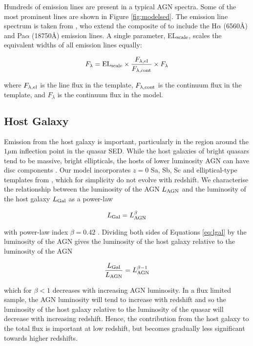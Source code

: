 Hundreds of emission lines are present in a typical AGN spectra. 
Some of the most prominent lines are shown in Figure \ref{fig:modelsed}. 
The emission line spectrum is taken from \citet{maddox06}, who extend the composite of \citet{francis91} to include the H$\alpha$ (6560\AA) and Pa$\alpha$ (18750\AA) emission lines. 
A single parameter, EL$_{\rm scale}$, scales the equivalent widths of all emission lines equally:

\begin{eqnarray}
  F_{\lambda} =  {\rm EL}_{\rm scale} \times \frac{F_{\lambda, \rm el}}{F_{\lambda, \rm cont}} \times F_{\lambda} 
\end{eqnarray} 

where $F_{\lambda, \rm el}$ is the line flux in the template, $F_{\lambda,\rm cont}$ is the continuum flux in the template, and $F_{\lambda}$ is the continuum flux in the model.  

\subsection{Host Galaxy}

Emission from the host galaxy is important, particularly in the region around the $1\mu$m inflection point in the quasar SED. 
While the host galaxies of bright quasars tend to be massive, bright ellipticals, the hosts of lower luminosity AGN can have disc components \citep[e.g.][]{dunlop03}. 
Our model incorporates $z=0$ Sa, Sb, Sc and elliptical-type templates from \citet{mannucci01}, which for simplicity do not evolve with redshift. 
We characterise the relationship between the luminosity of the AGN $L_{\rm AGN}$ and the luminosity of the host galaxy $L_{\rm Gal}$ as a power-law

\begin{eqnarray}
  \label{eq:lgal}
  L_{\rm Gal} = L_{\rm AGN}^{\beta} 
\end{eqnarray}

with power-law index $\beta=0.42$ \citep{maddox06}. 
Dividing both sides of Equations \ref{eq:lgal} by the luminosity of the AGN gives the luminosity of the host galaxy relative to the luminosity of the AGN

\begin{eqnarray}
  \frac{L_{\rm Gal}}{L_{\rm AGN}} = L_{\rm AGN}^{\beta - 1} 
\end{eqnarray}

which for $\beta < 1$ decreases with increasing AGN luminosity. 
In a flux limited sample, the AGN luminosity will tend to increase with redshift and so the luminosity of the host galaxy relative to the luminosity of the quasar will decrease with increasing redshift. 
Hence, the contribution from the host galaxy to the total flux is important at low redshift, but becomes gradually less significant towards higher redshifts. 

